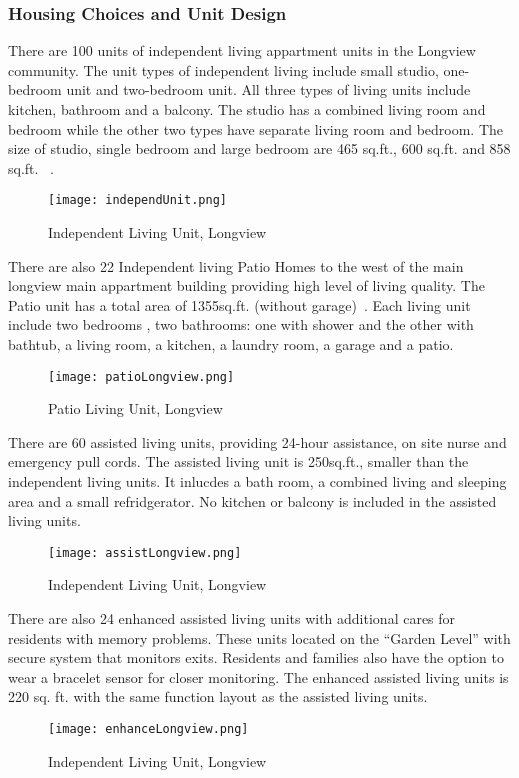 \subsubsection{Housing Choices and Unit Design}
There are 100 units of independent living appartment units in the
Longview community. The unit types of independent living include small
studio, one-bedroom unit and two-bedroom unit. All three types of
living units include kitchen, bathroom and a balcony. The studio has a
combined living room and bedroom while the other two types have
separate living room and bedroom. The size of studio, single bedroom
and large bedroom are 465 sq.ft., 600 sq.ft. and 858
sq.ft. ~\cite{LongviewIndepend}.
\begin{figure}[htbp]
  \centering
  \texttt{[image: independUnit.png]}
  \caption[Independent Living Unit, Longview]{Independent Living
    Unit, Longview~\cite{LongviewIndepend}}
  \label{fig:independUnit}
\end{figure}

There are also 22 Independent living Patio Homes to the west of the
main longview main appartment building providing high level of living
quality. The Patio unit has a total area of 1355sq.ft. (without
garage)~\cite{LongviewPatio}. Each living unit include two bedrooms ,
two bathrooms: one with shower and the other with bathtub, a living
room, a kitchen, a laundry room, a garage and a patio.
\begin{figure}[htbp]
  \centering
  \texttt{[image: patioLongview.png]}
  \caption[Patio Living Unit, Longview]{Patio Living
    Unit, Longview~\cite{patioLongview}}
  \label{fig:patioLongview}
\end{figure}

There are 60 assisted living units, providing 24-hour assistance, on 
site nurse and emergency pull cords. The assisted living unit is
250sq.ft., smaller than the independent living units. It inlucdes a
bath room, a combined living and sleeping area and a
small refridgerator. No kitchen or balcony is included in the assisted
living units.
\begin{figure}[htbp]
  \centering
  \texttt{[image: assistLongview.png]}
  \caption[Independent Living Unit, Longview]{Independent Living
    Unit, Longview~\cite{LongviewAssist}}
  \label{fig:assistLongview}
\end{figure}
There are also 24 enhanced assisted living units with additional cares
for residents with memory problems. These units located on the
``Garden Level'' with secure system that monitors exits. Residents
and families also have the option to wear a bracelet sensor for closer
monitoring. The enhanced assisted living units is 220 sq. ft. with the
same function layout as the assisted living units.
\begin{figure}[htbp]
  \centering
  \texttt{[image: enhanceLongview.png]}
  \caption[Independent Living Unit, Longview]{Independent Living
    Unit, Longview~\cite{enhanceLongview}}
  \label{fig:enhanceLongview}
\end{figure}
